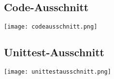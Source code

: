 \subsection{Code-Ausschnitt}
\label{sec:Anhang:Code-Ausschnitt}

\texttt{[image: codeausschnitt.png]}

\subsection{Unittest-Ausschnitt}
\label{sec:Anhang:Unittest-Ausschnitt}

\texttt{[image: unittestausschnitt.png]}
